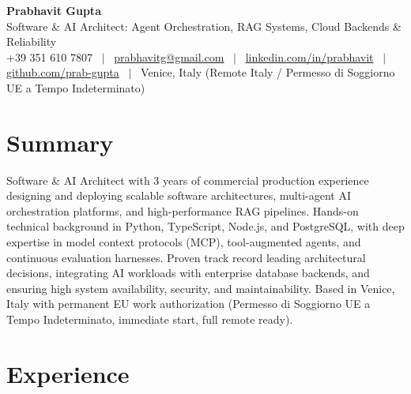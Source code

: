 \documentclass[a4paper,10pt]{article}
\begin{document}
\begin{minipage}[c]{0.80\textwidth}
  {\Huge\bfseries Prabhavit Gupta}\\[3pt]
  {\color{accent}\large Software \& AI Architect: Agent Orchestration, RAG Systems, Cloud Backends \& Reliability}\\[6pt]
  {\footnotesize +39 351 610 7807 ~$\vert$~
  \href{mailto:prabhavitg@gmail.com}{prabhavitg@gmail.com} ~$\vert$~
  \href{https://www.linkedin.com/in/prabhavit/}{linkedin.com/in/prabhavit} ~$\vert$~
  \href{https://github.com/prab-gupta}{github.com/prab-gupta} ~$\vert$~
  Venice, Italy (Remote Italy / Permesso di Soggiorno UE a Tempo Indeterminato)}
\end{minipage}\hfill

\section{Summary}
Software \& AI Architect with 3 years of commercial production experience designing and deploying scalable software architectures, multi-agent AI orchestration platforms, and high-performance RAG pipelines. Hands-on technical background in Python, TypeScript, Node.js, and PostgreSQL, with deep expertise in model context protocols (MCP), tool-augmented agents, and continuous evaluation harnesses. Proven track record leading architectural decisions, integrating AI workloads with enterprise database backends, and ensuring high system availability, security, and maintainability. Based in Venice, Italy with permanent EU work authorization (Permesso di Soggiorno UE a Tempo Indeterminato, immediate start, full remote ready).

\section{Experience}
\end{document}
